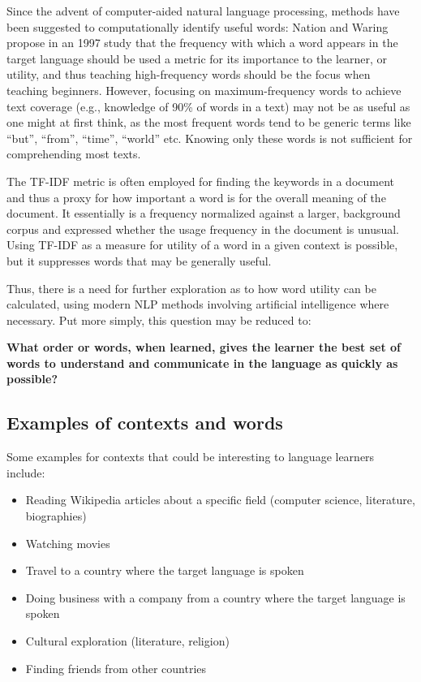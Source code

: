 Since the advent of computer-aided natural language processing, methods have been suggested to computationally identify useful words:
Nation and Waring propose in an 1997 study \cite{nationVocabularySizeText1997} that the frequency with which a word appears in the target language should be used a metric for its importance to the learner, or utility, and thus teaching high-frequency words should be the focus when teaching beginners.
However, focusing on maximum-frequency words to achieve text coverage (e.g., knowledge of 90\% of words in a text) may not be as useful as one might at first think, as the most frequent words tend to be generic terms like “but”, “from”, “time”, “world” etc.
Knowing only these words is not sufficient for comprehending most texts.

The TF-IDF metric \cite{qaiserTextMiningUse2018} is often employed for finding the keywords in a document and thus a proxy for how important a word is for the overall meaning of the document.
It essentially is a frequency normalized against a larger, background corpus and expressed whether the usage frequency in the document is unusual.
Using TF-IDF as a measure for utility of a word in a given context is possible, but it suppresses words that may be generally useful.

Thus, there is a need for further exploration as to how word utility can be calculated, using modern NLP methods involving artificial intelligence where necessary.
Put more simply, this question may be reduced to:

\textbf{What order or words, when learned, gives the learner the best set of words to understand and communicate in the language as quickly as possible?}

\subsection{Examples of contexts and words}
Some examples for contexts that could be interesting to language learners include:

\begin{itemize}
	\item Reading Wikipedia articles about a specific field (computer science, literature, biographies)
	\item Watching movies
	\item Travel to a country where the target language is spoken
	\item Doing business with a company from a country where the target language is spoken
	\item Cultural exploration (literature, religion)
	\item Finding friends from other countries
\end{itemize}

